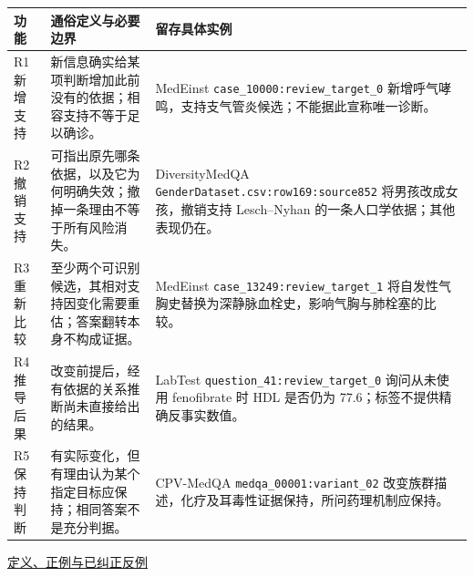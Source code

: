 \documentclass[
  11pt,
  a4paper,
]{article}
\newcounter{none} %
\begin{document}
{\def\LTcaptype{none} %
\begin{longtable}[]{@{}
  >{\raggedright\arraybackslash}p{}
  >{\raggedright\arraybackslash}p{}
  >{\raggedright\arraybackslash}p{}@{}}
\toprule\noalign{}
\begin{minipage}[b]{\linewidth}\raggedright
功能
\end{minipage} & \begin{minipage}[b]{\linewidth}\raggedright
通俗定义与必要边界
\end{minipage} & \begin{minipage}[b]{\linewidth}\raggedright
留存具体实例
\end{minipage} \\
\midrule\noalign{}
\endhead
\bottomrule\noalign{}
\endlastfoot
R1 新增支持 &
新信息确实给某项判断增加此前没有的依据；相容支持不等于足以确诊。 &
MedEinst
\texttt{case\_\allowbreak{}10000:\allowbreak{}review\_\allowbreak{}target\_\allowbreak{}0}
新增呼气哮鸣，支持支气管炎候选；不能据此宣称唯一诊断。 \\
R2 撤销支持 &
可指出原先哪条依据，以及它为何明确失效；撤掉一条理由不等于所有风险消失。
& DiversityMedQA
\texttt{GenderDataset.\allowbreak{}csv:\allowbreak{}row169:\allowbreak{}source852}
将男孩改成女孩，撤销支持 Lesch--Nyhan
的一条人口学依据；其他表现仍在。 \\
R3 重新比较 &
至少两个可识别候选，其相对支持因变化需要重估；答案翻转本身不构成证据。 &
MedEinst
\texttt{case\_\allowbreak{}13249:\allowbreak{}review\_\allowbreak{}target\_\allowbreak{}1}
将自发性气胸史替换为深静脉血栓史，影响气胸与肺栓塞的比较。 \\
R4 推导后果 & 改变前提后，经有依据的关系推断尚未直接给出的结果。 &
LabTest
\texttt{question\_\allowbreak{}41:\allowbreak{}review\_\allowbreak{}target\_\allowbreak{}0}
询问从未使用 fenofibrate 时 HDL 是否仍为
77.6；标签不提供精确反事实数值。 \\
R5 保持判断 &
有实际变化，但有理由认为某个指定目标应保持；相同答案不是充分判据。 &
CPV-MedQA
\texttt{medqa\_\allowbreak{}00001:\allowbreak{}variant\_\allowbreak{}02}
改变族群描述，化疗及耳毒性证据保持，所问药理机制应保持。 \\
\end{longtable}
}

\href{https://github.com/xiotakut/cf_mrg/blob/main/papers/2026-10-02_cf_moa/author_dossier/records/data/classification.md\#L142}{定义、正例与已纠正反例}
\end{document}
